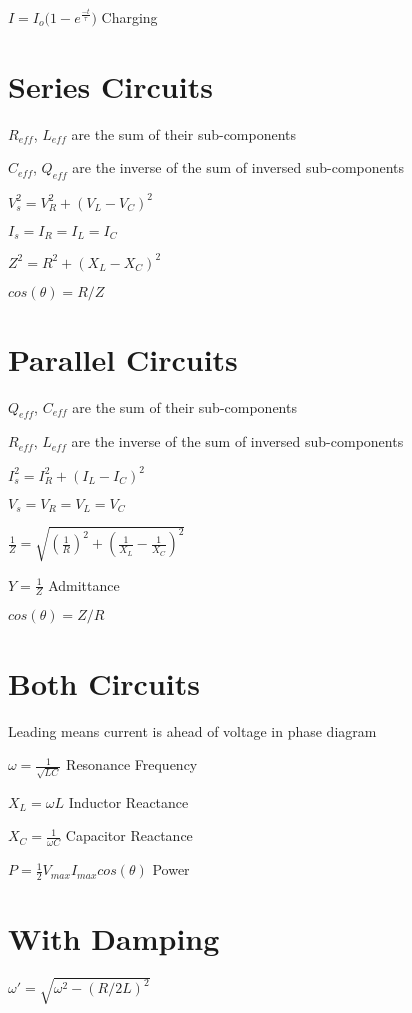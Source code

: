\documentclass{article}
\begin{document}
\LARGE$I = I_o({1-e^{\frac{-t}{\tau} })}$
\large{Charging}



\section{Series Circuits}

\large {$R_{eff}$, $L_{eff}$ are the sum of their sub-components}

\large {$C_{eff}$, $Q_{eff}$ are the inverse of the sum of inversed sub-components }

\LARGE$V_s^2 =V_R^2+(V_L-V_C)^2$

\LARGE$I_s =I_R=I_L=I_C$

\LARGE$Z^2 =R^2+(X_L-X_C)^2$

\LARGE$cos(\theta)=R/Z$

\section{Parallel Circuits}

\large {$Q_{eff}$, $C_{eff}$ are the sum of their sub-components}

\large {$R_{eff}$, $L_{eff}$ are the inverse of the sum of inversed sub-components }


\LARGE$I_s^2 =I_R^2+(I_L-I_C)^2$

\LARGE$V_s =V_R=V_L=V_C$

\LARGE$\frac{1}{Z} =\sqrt{(\frac{1}{R})^2+(\frac{1}{X_L}-\frac{1}{X_C})^2}$

\LARGE$Y=\frac{1}{Z}$
\large {Admittance}

\LARGE$cos(\theta)=Z/R$

\section{ Both Circuits}

\large {Leading means current is ahead of voltage in phase diagram}

\LARGE$\omega=\frac{1}{\sqrt{LC}}$
\large {Resonance Frequency}

\LARGE$X_L=\omega{L}$
\large {Inductor Reactance}

\LARGE$X_C=\frac{1}{\omega{C}}$
\large {Capacitor Reactance}

\LARGE$P=\frac{1}{2}V_{max}I_{max}cos(\theta)$
\large {Power}

\section {With Damping}

\LARGE$\omega\prime=\sqrt{\omega^2-(R/2L)^2}$
\end{document}
